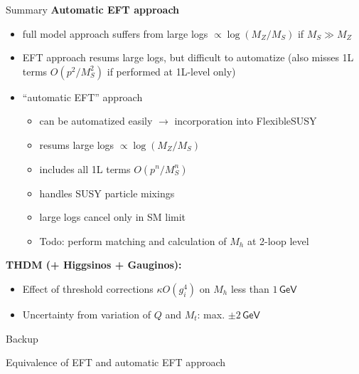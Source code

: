 \documentclass[hyperref={pdfpagelabels=false},ngerman]{beamer}
\newcommand{\eh}[1]{\,\mathsf{#1}}
\renewcommand{\emph}{\textbf}
\begin{document}
\begin{frame}{Summary}
  \emph{Automatic EFT approach}
  \begin{itemize}
  \item full model approach suffers from large logs
    $\propto\log(M_Z/M_S)$ if $M_S \gg M_Z$
  \item EFT approach resums large logs, but difficult to automatize
    (also misses 1L terms $O(p^2/M_S^2)$ if performed at 1L-level
    only)
  \item ``automatic EFT'' approach
    \begin{itemize}
    \item can be automatized easily $\rightarrow$ incorporation into
      FlexibleSUSY
    \item resums large logs $\propto\log(M_Z/M_S)$
    \item includes all 1L terms $O(p^n/M_S^n)$
    \item handles SUSY particle mixings
    \item large logs cancel only in SM limit
    \item Todo: perform matching and calculation of $M_h$ at 2-loop level
    \end{itemize}
  \end{itemize}
  \emph{THDM (+ Higgsinos + Gauginos):}
  \begin{itemize}
  \item Effect of threshold corrections $\kappa O(g_i^4)$ on $M_h$
    less than $1\eh{GeV}$
  \item Uncertainty from variation of $Q$ and $M_t$: max. $\pm 2\eh{GeV}$
  \end{itemize}
\end{frame}


\begin{frame}[noframenumbering]
  \begin{center}
    \Huge Backup
  \end{center}
\end{frame}


\begin{frame}[noframenumbering]
  \begin{center}
    \Large Equivalence of EFT and automatic EFT approach
  \end{center}
\end{frame}
\end{document}
